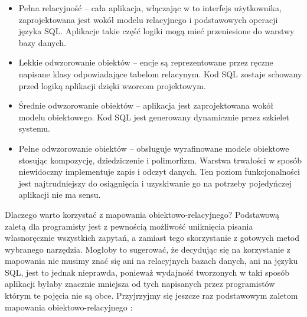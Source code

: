 \documentclass[12pt]{report}
\begin{document}
\begin{itemize}
\item Pełna relacyjność -- cała aplikacja, włączając w to interfejs użytkownika, zaprojektowana jest wokół modelu relacyjnego i podstawowych operacji języka SQL. Aplikacje
takie część logiki mogą mieć przeniesione do warstwy bazy danych.
\item Lekkie odwzorowanie obiektów -- encje są reprezentowane przez ręczne na\-pisane klasy odpowiadające tabelom relacynym. Kod SQL zostaje schowany przed logiką
aplikacji dzięki wzorcom projektowym.
\item Średnie odwzorowanie obiektów -- aplikacja jest zaprojektowana wokół modelu obiektowego. Kod SQL jest generowany dynamicznie przez szkielet systemu.
\item Pełne odwzorowanie obiektów -- obsługuje wyrafinowane modele obiektowe stosując kompozycję, dziedziczenie i polimorfizm. Warstwa trwałości w spo\-sób niewidoczny
implementuje zapis i odczyt danych. Ten poziom funkcjonalności jest najtrudniejszy do osiągnięcia i uzyskiwanie go na potrzeby pojedyńczej aplikacji nie ma sensu.
\end{itemize}

Dlaczego warto korzystać z mapowania obiektowo-relacyjnego? Podstawową zaletą dla programisty jest z pewnością możliwość uniknięcia pisania własnoręcznie wszystkich
zapytań, a zamiast tego skorzystanie z gotowych metod wybranego narzędzia. Mogłoby to sugerować, że decydując się na korzystanie z mapowania nie musimy znać się
ani na relacyjnych bazach danych, ani na języku SQL, jest to jednak nieprawda, ponieważ wydajność tworzonych w taki sposób aplikacji byłaby znacznie mniejsza od tych
napisanych przez programistów którym te pojęcia nie są obce. Przyjrzyjmy się jeszcze raz podstawowym zaletom mapowania obiektowo-relacyjnego \cite{hibernate}:
\end{document}
